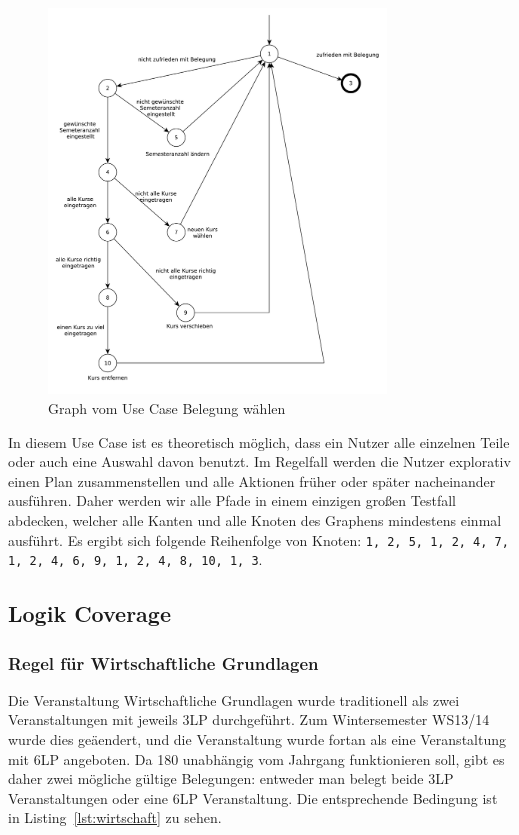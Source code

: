 \documentclass[ngerman]{article}
\begin{document}
\begin{figure}[h!]
\includegraphics[width=0.8\textwidth]{figures/belegung_waehlen_use_case.pdf}
\caption{Graph vom Use Case Belegung wählen}
\label{fig:graph_belegung_waehlen}
\end{figure}

In diesem Use Case ist es theoretisch möglich, dass ein Nutzer alle einzelnen Teile oder auch eine Auswahl davon benutzt. Im Regelfall werden die Nutzer explorativ einen Plan zusammenstellen und alle Aktionen früher oder später nacheinander ausführen.
Daher werden wir alle Pfade in einem einzigen großen Testfall abdecken, welcher alle Kanten und alle Knoten des Graphens mindestens einmal ausführt.
Es ergibt sich folgende Reihenfolge von Knoten:
\texttt{1, 2, 5, 1, 2, 4, 7, 1, 2, 4, 6, 9, 1, 2, 4, 8, 10, 1, 3}.


\subsection{Logik Coverage}

\subsubsection{Regel für Wirtschaftliche Grundlagen}

Die Veranstaltung Wirtschaftliche Grundlagen wurde traditionell als zwei Veranstaltungen mit jeweils 3LP durchgeführt.
Zum Wintersemester WS13/14 wurde dies geäendert, und die Veranstaltung wurde fortan als eine Veranstaltung mit 6LP angeboten.
Da 180 unabhängig vom Jahrgang funktionieren soll, gibt es daher zwei mögliche gültige Belegungen: entweder man belegt beide 3LP Veranstaltungen oder eine 6LP Veranstaltung.
Die entsprechende Bedingung ist in Listing~\ref{lst:wirtschaft} zu sehen.
\end{document}

